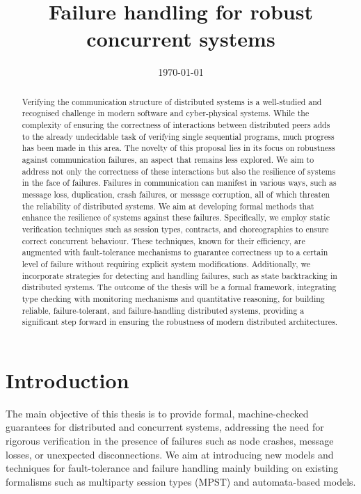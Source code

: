 \documentclass{article}
\title{Failure handling for robust concurrent  systems}
\date{\today}
\theoremstyle{definition}
\theoremstyle{definition}
\begin{document}
\maketitle
\begin{abstract}
Verifying the communication structure of distributed systems is a well-studied and recognised challenge in modern software and cyber-physical systems. While the complexity of ensuring the correctness of interactions between distributed peers adds to the already undecidable task of verifying single sequential programs, much progress has been made in this area. The novelty of this proposal lies in its focus on robustness against communication failures, an aspect that remains less explored. We aim to address not only the correctness of these interactions but also the resilience of systems in the face of failures.
Failures in communication can manifest in various ways, such as message loss, duplication, crash failures, or message corruption, all of which threaten the reliability of distributed systems. We aim at developing formal methods that enhance the resilience of systems against these failures. Specifically, we employ static verification techniques such as session types, contracts, and choreographies to ensure correct concurrent behaviour. These techniques, known for their efficiency, are augmented with fault-tolerance mechanisms to guarantee correctness up to a certain level of failure without requiring explicit system modifications. Additionally, we incorporate strategies for detecting and handling failures, such as state backtracking in distributed systems.
 The outcome of the thesis will be a formal framework, integrating type checking with monitoring mechanisms and quantitative reasoning, for building reliable, failure-tolerant, and failure-handling distributed systems, providing a significant step forward in ensuring the robustness of modern distributed architectures.

\end{abstract}

\section{Introduction}
The main objective of this thesis is to provide formal, machine-checked guarantees for distributed and concurrent systems, addressing the need for rigorous verification in the presence of failures such as node crashes, message losses, or unexpected disconnections. We aim at introducing new models and techniques for fault-tolerance and failure handling mainly building on existing formalisms such as multiparty session types (MPST) and automata-based models.
\end{document}

